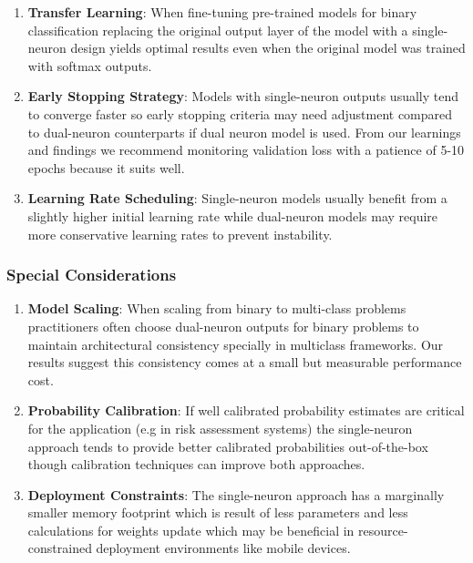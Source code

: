 \begin{enumerate}
\item \textbf{Transfer Learning}: When fine-tuning pre-trained models for binary classification replacing the original output layer of the model with a single-neuron design yields optimal results even when the original model was trained with softmax outputs.

\item \textbf{Early Stopping Strategy}: Models with single-neuron outputs usually tend to converge faster so early stopping criteria may need adjustment compared to dual-neuron counterparts if dual neuron model is used. From our learnings and findings we recommend monitoring validation loss with a patience of 5-10 epochs because it suits well.

\item \textbf{Learning Rate Scheduling}: Single-neuron models usually benefit from a slightly higher initial learning rate while dual-neuron models may require more conservative learning rates to prevent instability.
\end{enumerate}

\subsubsection{Special Considerations}

\begin{enumerate}
\item \textbf{Model Scaling}: When scaling from binary to multi-class problems practitioners often choose dual-neuron outputs for binary problems to maintain architectural consistency specially in multiclass frameworks. Our results suggest this consistency comes at a small but measurable performance cost.

\item \textbf{Probability Calibration}: If well calibrated probability estimates are critical for the application (e.g in risk assessment systems) the single-neuron approach tends to provide better calibrated probabilities out-of-the-box though calibration techniques can improve both approaches.

\item \textbf{Deployment Constraints}: The single-neuron approach has a marginally smaller memory footprint which is result of less parameters and less calculations for weights update which may be beneficial in resource-constrained deployment environments like mobile devices.
\end{enumerate}
